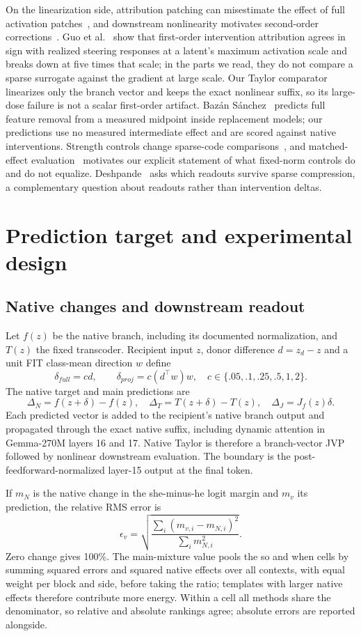\documentclass[11pt]{article}
\begin{document}
On the linearization side, attribution patching can misestimate the effect of full activation patches~\cite{syed2023}, and downstream nonlinearity motivates second-order corrections~\cite{zhangwang2026}. Guo et al.~\cite{guo2026} show that first-order intervention attribution agrees in sign with realized steering responses at a latent's maximum activation scale and breaks down at five times that scale; in the parts we read, they do not compare a sparse surrogate against the gradient at large scale. Our Taylor comparator linearizes only the branch vector and keeps the exact nonlinear suffix, so its large-dose failure is not a scalar first-order artifact. Bazán Sánchez~\cite{bazan2026} predicts full feature removal from a measured midpoint inside replacement models; our predictions use no measured intermediate effect and are scored against native interventions. Strength controls change sparse-code comparisons~\cite{zhang2026}, and matched-effect evaluation~\cite{luo2026} motivates our explicit statement of what fixed-norm controls do and do not equalize. Deshpande~\cite{deshpande2026} asks which readouts survive sparse compression, a complementary question about readouts rather than intervention deltas.

\section{Prediction target and experimental design}
\subsection{Native changes and downstream readout}
Let $f(z)$ be the native branch, including its documented normalization, and $T(z)$ the fixed transcoder. Recipient input $z$, donor difference $d=z_d-z$ and a unit FIT class-mean direction $w$ define
\[
 \delta_{full}=cd,\qquad \delta_{proj}=c(d^\top w)w,
 \quad c\in\{.05,.1,.25,.5,1,2\}.
\]
The native target and main predictions are
\[
 \Delta_N=f(z+\delta)-f(z),\quad
 \Delta_T=T(z+\delta)-T(z),\quad
 \Delta_J=J_f(z)\delta.
\]
Each predicted vector is added to the recipient's native branch output and propagated through the exact native suffix, including dynamic attention in Gemma-270M layers 16 and 17. Native Taylor is therefore a branch-vector JVP followed by nonlinear downstream evaluation. The boundary is the post-feedforward-normalized layer-15 output at the final token.

If $m_N$ is the native change in the she-minus-he logit margin and $m_v$ its prediction, the relative RMS error is
\[
 \epsilon_v=\sqrt{\frac{\sum_i(m_{v,i}-m_{N,i})^2}{\sum_i m_{N,i}^2}}.
\]
Zero change gives 100\%. The main-mixture value pools the so and when cells by summing squared errors and squared native effects over all contexts, with equal weight per block and side, before taking the ratio; templates with larger native effects therefore contribute more energy. Within a cell all methods share the denominator, so relative and absolute rankings agree; absolute errors are reported alongside.
\end{document}
